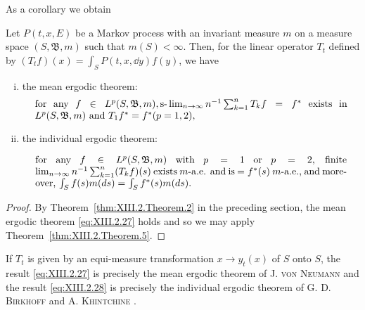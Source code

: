 As a corollary we obtain 

\begin{theorem}\label{thm:XIII.2.Theorem.6} Let $P(t, x, E)$ be a Markov process with an invariant measure $m$ on a measure space $(S, \mathfrak{B}, m)$ such that $m(S) < \infty$. Then, for the linear operator $T_t$ defined by $(T_t f)(x) = \int_S P(t, x, \dd y)f(y)$, we have
\begin{enumerate}[i)]
\item the mean ergodic theorem: 
\begin{equation}
\label{eq:XIII.2.27}
\begin{minipage}{0.92\linewidth}
\everymath{}\let\limits\nolimits
for any $f \in L ^{p} (S, \mathfrak {B}, m), \slim _{n \to \infty} n ^{-1} \sum\limits_{k=1} ^{n} T _{k} f = f ^{*}$ exists in $L^p(S, \mathfrak{B}, m)$ and $T_1 f^* = f^*   (p = 1, 2),$
\end{minipage}
\end{equation}


\item the individual ergodic theorem: 

\begin{equation}\label{eq:XIII.2.28}
\parbox{0.92\linewidth}{\everymath{}\let\limits\nolimits for any $f \in L^{p}(S, \mathfrak{B}, m)$ with $p = 1$ or $p = 2$, finite $\lim\limits_{n\to \infty}n^{-1}\sum\limits_{k=1}^{n}(T_kf)(s)$ exists $m$-a.e. and is $= f^{*}(s)$ $m$-a.e., and moreover, $\int_{S}f(s)m(ds) = \int_{S}f^{*}(s)m(ds)$.}
\end{equation}
\end{enumerate}
\end{theorem}

\begin{proof}
 By Theorem~\ref{thm:XIII.2.Theorem.2} in the preceding section, the mean ergodic theorem \eqref{eq:XIII.2.27} holds and so we may apply Theorem~\ref{thm:XIII.2.Theorem.5}. 
\end{proof}

\begin{remarku} If $T_{t}$ is given by an equi-measure transformation $x \to y_{t}(x)$ of $S$ onto $S$, the result \eqref{eq:XIII.2.27} is precisely the mean ergodic theorem of J. \textsc{von} \textsc{Neumann} \cite{neumann230} and the result \eqref{eq:XIII.2.28} is precisely the individual ergodic theorem of G. D. \textsc{Birkhoff} \cite{birkhoff18} and A. \textsc{Khintchine} \cite{khintchine149}. 
\end{remarku}


